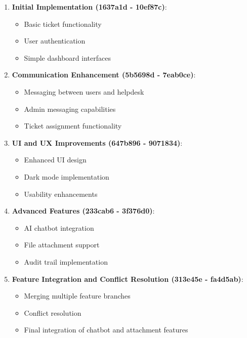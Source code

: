 \documentclass[12pt,a4paper]{article}
\begin{document}
\begin{enumerate}
    \item \textbf{Initial Implementation (1637a1d - 10ef87c)}:
    \begin{itemize}
        \item Basic ticket functionality
        \item User authentication
        \item Simple dashboard interfaces
    \end{itemize}
    
    \item \textbf{Communication Enhancement (5b5698d - 7eab0ce)}:
    \begin{itemize}
        \item Messaging between users and helpdesk
        \item Admin messaging capabilities
        \item Ticket assignment functionality
    \end{itemize}
    
    \item \textbf{UI and UX Improvements (647b896 - 9071834)}:
    \begin{itemize}
        \item Enhanced UI design
        \item Dark mode implementation
        \item Usability enhancements
    \end{itemize}
    
    \item \textbf{Advanced Features (233cab6 - 3f376d0)}:
    \begin{itemize}
        \item AI chatbot integration
        \item File attachment support
        \item Audit trail implementation
    \end{itemize}
    
    \item \textbf{Feature Integration and Conflict Resolution (313e45e - fa4d5ab)}:
    \begin{itemize}
        \item Merging multiple feature branches
        \item Conflict resolution
        \item Final integration of chatbot and attachment features
    \end{itemize}
\end{enumerate}
\end{document}
